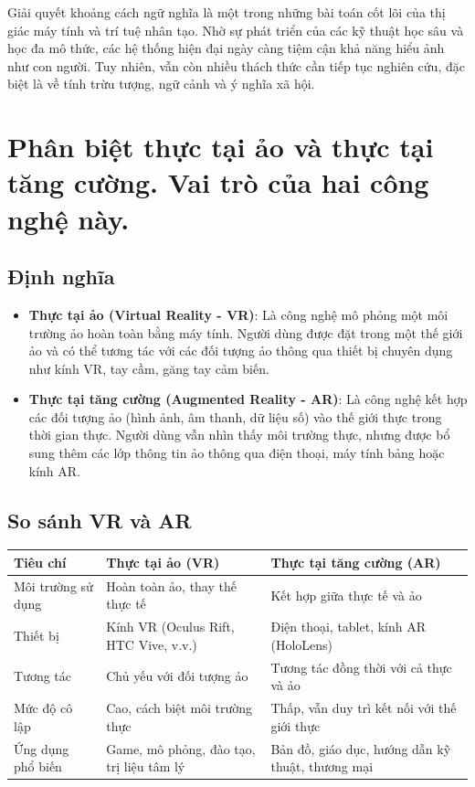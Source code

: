 \documentclass[12pt]{article}
\begin{document}
	Giải quyết khoảng cách ngữ nghĩa là một trong những bài toán cốt lõi của thị giác máy tính và trí tuệ nhân tạo. Nhờ sự phát triển của các kỹ thuật học sâu và học đa mô thức, các hệ thống hiện đại ngày càng tiệm cận khả năng hiểu ảnh như con người. Tuy nhiên, vẫn còn nhiều thách thức cần tiếp tục nghiên cứu, đặc biệt là về tính trừu tượng, ngữ cảnh và ý nghĩa xã hội.
	
	\section{Phân biệt thực tại ảo và thực tại tăng cường. Vai trò của hai công nghệ này.}
	
	\subsection{Định nghĩa}
	
	\begin{itemize}
	\item \textbf{Thực tại ảo (Virtual Reality - VR)}: 
	Là công nghệ mô phỏng một môi trường ảo hoàn toàn bằng máy tính. Người dùng được đặt trong một thế giới ảo và có thể tương tác với các đối tượng ảo thông qua thiết bị chuyên dụng như kính VR, tay cầm, găng tay cảm biến.
	
	\item \textbf{Thực tại tăng cường (Augmented Reality - AR)}: 
	Là công nghệ kết hợp các đối tượng ảo (hình ảnh, âm thanh, dữ liệu số) vào thế giới thực trong thời gian thực. Người dùng vẫn nhìn thấy môi trường thực, nhưng được bổ sung thêm các lớp thông tin ảo thông qua điện thoại, máy tính bảng hoặc kính AR.
	\end{itemize}
	
	\subsection{So sánh VR và AR}
	
	\begin{center}
	\begin{tabular}{|p{5cm}|p{5cm}|p{5cm}|}
	\hline
	\textbf{Tiêu chí} & \textbf{Thực tại ảo (VR)} & \textbf{Thực tại tăng cường (AR)} \\
	\hline
	Môi trường sử dụng & Hoàn toàn ảo, thay thế thực tế & Kết hợp giữa thực tế và ảo \\
	\hline
	Thiết bị & Kính VR (Oculus Rift, HTC Vive, v.v.) & Điện thoại, tablet, kính AR (HoloLens) \\
	\hline
	Tương tác & Chủ yếu với đối tượng ảo & Tương tác đồng thời với cả thực và ảo \\
	\hline
	Mức độ cô lập & Cao, cách biệt môi trường thực & Thấp, vẫn duy trì kết nối với thế giới thực \\
	\hline
	Ứng dụng phổ biến & Game, mô phỏng, đào tạo, trị liệu tâm lý & Bản đồ, giáo dục, hướng dẫn kỹ thuật, thương mại \\
	\hline
	\end{tabular}
	\end{center}
	
\end{document}
